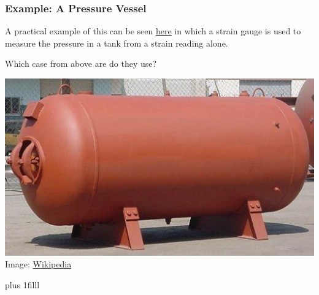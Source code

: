 \documentclass[fleqn]{beamer} %
\newcommand{\sectionIIIsubsectionIVtitle}{Example: A Pressure Vessel}
\newcommand{\btVFill}{\vskip0pt plus 1filll}
\begin{document}
		\begin{frame} \scriptsize
		\frametitle{\sectionIIIsubsectionIVtitle}
		\bigskip

		A practical example of this can be seen \href{http://cecs.wright.edu/~rsrin/Courses/Egr190-191/PV-EGR191.pdf}{\PR here} in which a strain gauge is used to measure the pressure in a tank from a strain reading alone. \vspc

Which case from above are do they use?

\includegraphics[scale=.4]{images/pressure_vessel.jpg}
{\tiny Image: \href{https://en.wikipedia.org/wiki/Pressure_vessel}{Wikipedia} }




		\btVFill

		\end{frame}
	
\end{document}
